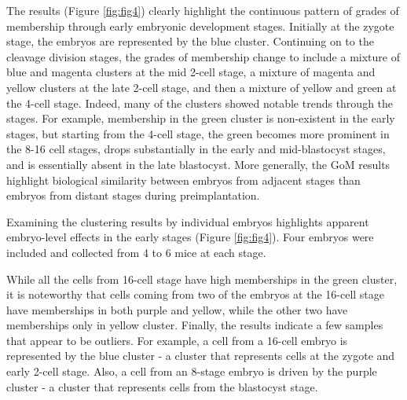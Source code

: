 The results (Figure \ref{fig:fig4}) clearly highlight the continuous pattern of grades of membership through early embryonic development stages. Initially at the zygote stage, the embryos are represented by the blue cluster. Continuing on to the cleavage division stages, the grades of membership change to include a mixture of blue and magenta clusters at the mid 2-cell stage, a mixture of magenta and yellow clusters at the late 2-cell stage, and then a mixture of yellow and green at the 4-cell stage. Indeed, many of the clusters showed notable trends through the stages. For example, membership in the green cluster is non-existent in the early stages, but starting from the 4-cell stage, the green becomes more prominent in the 8-16 cell stages, drops substantially in the early and mid-blastocyst stages, and is essentially absent in the late blastocyst. More generally, the GoM results highlight biological similarity between embryos from adjacent stages than embryos from distant stages during preimplantation. 

Examining the clustering results by individual embryos highlights apparent embryo-level effects in the early stages (Figure \ref{fig:fig4}). Four embryos were included and collected from 4 to 6 mice at each stage. 


While all the cells from 16-cell stage have high memberships in the green cluster, it is noteworthy that cells coming from two of the embryos at the 16-cell stage have memberships in both purple and yellow, while the other two  have memberships only in yellow cluster. Finally, the results indicate a few samples that appear to be outliers. For example, a cell from a 16-cell embryo is represented by the blue cluster - a cluster that represents cells at the zygote and early 2-cell stage. Also, a cell from an 8-stage embryo is driven by the purple cluster - a cluster that represents cells from the blastocyst stage.


